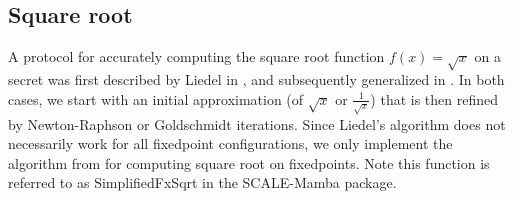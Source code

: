 \subsection{Square root}

A protocol for accurately computing the square root function $f(x) = \sqrt{x}$ on a
secret was first described by Liedel in \cite{Liedel2012SecureDC}, and subsequently
generalized in \cite{cryptoeprint:2019:354}. In both cases, we start with an initial
approximation (of $\sqrt{x}$ or $\frac{1}{\sqrt{x}}$) that is then refined by
Newton-Raphson or Goldschmidt iterations. Since Liedel's algorithm does not
necessarily work for all fixedpoint configurations, we only implement the algorithm
from \cite{cryptoeprint:2019:354} for computing square root on fixedpoints. Note this
function is referred to as SimplifiedFxSqrt in the SCALE-Mamba package.

